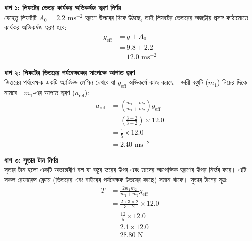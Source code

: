 \documentclass[12pt, a4paper]{article}
\begin{document}
\begin{tcolorbox}[solutionbox={সমাধান (Solution)}]
    \noindent
    \textbf{ধাপ ১: লিফটের ভেতর কার্যকর অভিকর্ষজ ত্বরণ নির্ণয়} \\
    যেহেতু লিফটটি $A_0 = 2.2\text{ ms}^{-2}$ ত্বরণে উপরের দিকে উঠছে, তাই লিফটের ভেতরের অজড়ীয় প্রসঙ্গ কাঠামোতে কার্যকর অভিকর্ষজ ত্বরণ হবে:
    \begin{align*}
        g_{\text{eff}} &= g + A_0 \\
        &= 9.8 + 2.2 \\
        &= 12.0\text{ ms}^{-2}
    \end{align*}
    
    \vspace{0.5em}
    \noindent\textbf{ধাপ ২: লিফটের ভিতরের পর্যবেক্ষকের সাপেক্ষে আপাত ত্বরণ} \\
    ভিতরের পর্যবেক্ষক একটি অ্যাটউড মেসিন দেখবে যা $g_{\text{eff}}$ অভিকর্ষে কাজ করছে। ভারী বস্তুটি ($m_1$) নিচের দিকে নামবে। $m_1$-এর আপাত ত্বরণ ($a_{\text{rel}}$):
    \begin{align*}
        a_{\text{rel}} &= \left(\frac{m_1 - m_2}{m_1 + m_2}\right) g_{\text{eff}} \\
        &= \left(\frac{3 - 2}{3 + 2}\right) \times 12.0 \\
        &= \frac{1}{5} \times 12.0 \\
        &= \mathbf{2.40}\text{ ms}^{-2}
    \end{align*}
    
    \vspace{0.5em}
    \noindent\textbf{ধাপ ৩: সুতার টান নির্ণয়} \\
    সুতার টান হলো একটি অভ্যন্তরীণ বল যা বস্তুর ভরের উপর এবং তাদের আপেক্ষিক ত্বরণের উপর নির্ভর করে। এটি সকল রেফারেন্স ফ্রেমে (ভিতরের এবং বাইরের পর্যবেক্ষক উভয়ের কাছে) সমান থাকে। সুতার টানের সূত্র:
    \begin{align*}
        T &= \frac{2 m_1 m_2}{m_1 + m_2} g_{\text{eff}} \\
        &= \frac{2 \times 3 \times 2}{3 + 2} \times 12.0 \\
        &= \frac{12}{5} \times 12.0 \\
        &= 2.4 \times 12.0 \\
        &= \mathbf{28.80}\text{ N}
    \end{align*}
\end{tcolorbox}
\end{document}
